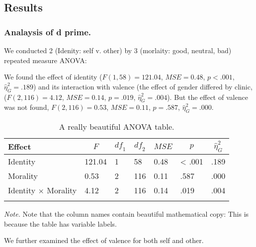 \documentclass[man]{apa6}
\begin{document}
\hypertarget{results-4}{%
\subsection{Results}\label{results-4}}

\hypertarget{analaysis-of-d-prime.-3}{%
\subsubsection{Analaysis of d prime.}\label{analaysis-of-d-prime.-3}}

We conducted 2 (Idenity: self v. other) by 3 (morlaity: good, neutral, bad) repeated measure ANOVA:

We found the effect of identity (\(F(1, 58) = 121.04\), \(\mathit{MSE} = 0.48\), \(p < .001\), \(\hat{\eta}^2_G = .189\)) and its interaction with valence (the effect of gender differed by clinic, (\(F(2, 116) = 4.12\), \(\mathit{MSE} = 0.14\), \(p = .019\), \(\hat{\eta}^2_G = .004\)). But the effect of valence was not found, \(F(2, 116) = 0.53\), \(\mathit{MSE} = 0.11\), \(p = .587\), \(\hat{\eta}^2_G = .000\).

\begin{table}[tbp]
\begin{center}
\begin{threeparttable}
\caption{\label{tab:unnamed-chunk-4}A really beautiful ANOVA table.}
\begin{tabular}{lllllll}
\toprule
Effect & \multicolumn{1}{c}{$F$} & \multicolumn{1}{c}{$\mathit{df}_1$} & \multicolumn{1}{c}{$\mathit{df}_2$} & \multicolumn{1}{c}{$\mathit{MSE}$} & \multicolumn{1}{c}{$p$} & \multicolumn{1}{c}{$\hat{\eta}^2_G$}\\
\midrule
Identity & 121.04 & 1 & 58 & 0.48 & < .001 & .189\\
Morality & 0.53 & 2 & 116 & 0.11 & .587 & .000\\
Identity $\times$ Morality & 4.12 & 2 & 116 & 0.14 & .019 & .004\\
\bottomrule
\addlinespace
\end{tabular}
\begin{tablenotes}[para]
\normalsize{\textit{Note.} Note that the column names contain beautiful mathematical copy: This is because the table has variable labels.}
\end{tablenotes}
\end{threeparttable}
\end{center}
\end{table}

We further examined the effect of valence for both self and other.
\end{document}
